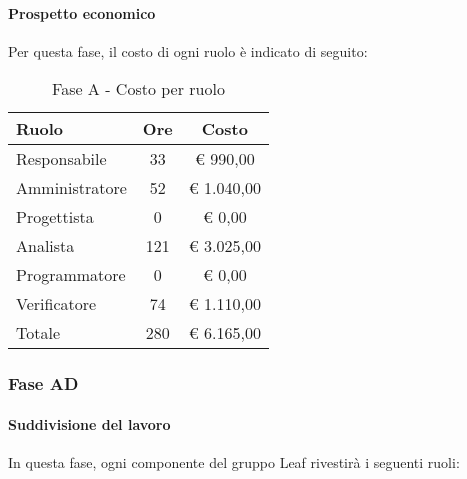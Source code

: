 \documentclass[../PianoProgetto.tex]{subfiles}
\begin{document}
	\paragraph{Prospetto economico}
					Per questa fase, il costo di ogni ruolo è indicato di seguito:
					\begin{table}[h]
		\centering
	
		\begin{tabular}{l * {2}{c}}
			\toprule
			Ruolo & Ore & Costo \\
			\midrule
			Responsabile &	33 & \euro{} 990,00 \\
			\midrule
			Amministratore & 52 & \euro{} 1.040,00 \\
			\midrule
			Progettista & 0 & \euro{} 0,00 \\
			\midrule
			Analista & 121 & \euro{} 3.025,00 \\
			\midrule
			Programmatore & 0 & \euro{} 0,00 \\
			\midrule
			Verificatore & 74 & \euro{} 1.110,00 \\
			\midrule		
			Totale & 280 & \euro{} 6.165,00 \\
			\bottomrule
			
		\end{tabular}
		
		\caption{Fase A - Costo per ruolo}
		\label{tab:faseA_costo}
		
	\end{table}
	\subsubsection{Fase AD}
				\paragraph{Suddivisione del lavoro}
					In questa fase, ogni componente del gruppo Leaf rivestirà i seguenti ruoli:
	
\end{document}
